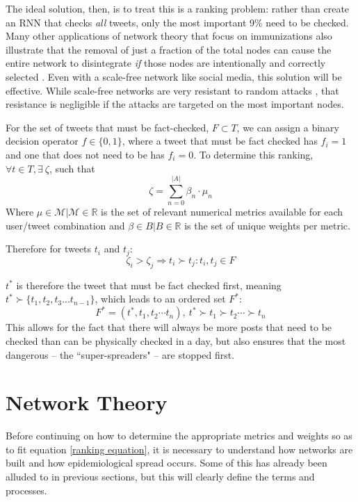 \documentclass[preprint,review,12pt]{elsarticle}
\begin{document}
 The ideal solution, then, is to treat this is a ranking problem: rather than create an RNN that checks \textit{all} tweets, only the most important 9\% need to be checked. Many other applications of network theory that focus on immunizations also illustrate that the removal of just a fraction of the total nodes can cause the entire network to disintegrate \textit{if} those nodes are intentionally and correctly selected  \cite{albert2000error,cohen2003efficient,helleringer2007sexual,cohen2001breakdown,hethcote2014gonorrhea}. Even with a scale-free network like social media, this solution will be effective. While scale-free networks are very resistant to random attacks \cite{albert2000error,callaway2000network,cohen2000resilience}, that resistance is negligible if the attacks are targeted on the most important nodes.
 
 For the set of tweets that must be fact-checked, $F \subset T$, we can assign a binary decision operator $f \in \{0,1\}$, where a tweet that must be fact checked has $f_i = 1$ and one that does not need to be has $f_i = 0$. To determine this ranking, $\forall t \in T, \exists \  \zeta$, such that 
 \begin{equation}
    \label{zeta function}
     \zeta = \sum_{n=0}^{|A|} \beta_{n} \cdot \mu_{n}
 \end{equation}
 Where $\mu \in \mathcal{M} | \mathcal{M} \in \mathbb{R}$ is the set of relevant numerical metrics available for each user/tweet combination and $\beta \in B| B \in \mathbb{R}$ is the set of unique weights per metric. 
 
 Therefore for tweets $t_i$ and $t_j$: 
  \begin{equation}
  \label{ranking equation}
      \zeta_i > \zeta_j \Rightarrow t_i \succ t_j : t_i, t_j \in F
  \end{equation}
  
  $t^*$ is therefore the tweet that must be fact checked first, meaning  $t^* \succ \{t_1, t_2, t_3 ... t_{n-1}\}$, which leads to an ordered set $F^*$:
  \begin{equation}
      F^* = (t^*, t_1, t_2 \cdots t_n), \ t^* \succ t_1 \succ t_2 \cdots \succ t_n
  \end{equation}
  This allows for the fact that there will always be more posts that need to be checked than can be physically checked in a day, but also ensures that the most dangerous -- the ``super-spreaders" -- are stopped first.
  


\section{Network Theory}
\label{sec: Background Definitions}
Before continuing on how to determine the appropriate metrics and weights so as to fit equation \ref{ranking equation}, it is necessary to understand how networks are built and how epidemiological spread occurs. Some of this has already been alluded to in previous sections, but this will clearly define the terms and processes.
\end{document}
